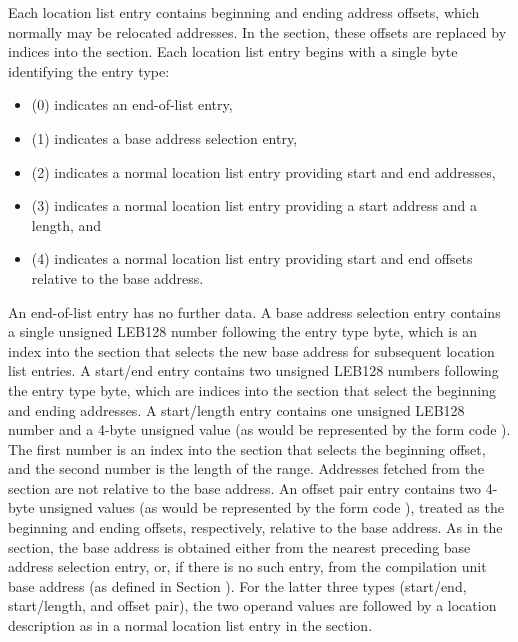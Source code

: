 Each location list entry contains beginning and ending address
offsets, which normally may be relocated addresses. In the
\dotdebuglocdwo{} section, these offsets are replaced by indices
into the \dotdebugaddr{} section. Each location list entry begins
with a single byte identifying the entry type:
\begin{itemize}
\item
\DWLLEendoflistentry{} (0) indicates an end-of-list entry,
\item
\DWLLEbaseaddressselectionentry{} (1) indicates a base address
selection entry, 
\item
\DWLLEstartendentry{} (2) indicates a normal
location list entry providing start and end addresses,
\item
\DWLLEstartlengthentry{} (3) indicates a normal location list
entry providing a start address and a length, and
\item
\DWLLEoffsetpairentry{} (4) indicates a normal location list
entry providing start and end offsets relative to the base
address. 
\end{itemize}
An end-of-list entry has no further data. A base address
selection entry contains a single unsigned LEB128
 number
following the entry type byte, which is an index into the
\dotdebugaddr{} section that selects the new base address for
subsequent location list entries. A start/end entry contains two
unsigned LEB128 numbers 
following the entry type byte, which are
indices into the \dotdebugaddr{} section that select the beginning
and ending addresses. A start/length entry contains one unsigned
LEB128 number and a 4-byte unsigned value (as would be
represented by the form code \DWFORMdatafour). The first number
is an index into the \dotdebugaddr{} section that selects the
beginning offset, and the second number is the length of the
range. Addresses fetched from the \dotdebugaddr{} section are not
relative to the base address. An offset pair entry contains two
4-byte unsigned values (as would be represented by the form code
\DWFORMdatafour){}, treated as the beginning and ending offsets,
respectively, relative to the base address. As in the \dotdebugloc{}
section, the base address is obtained either from the nearest
preceding base address selection entry, or, if there is no such
entry, from the compilation unit base address (as defined in
Section ). 
For the latter three types (start/end,
start/length, and offset pair), the two operand values are
followed by a location description as in a normal location list
entry in the \dotdebugloc{} section.

